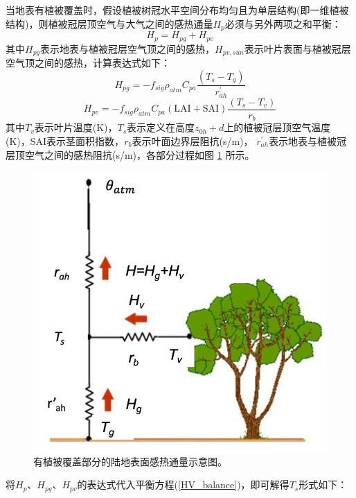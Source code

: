 当地表有植被覆盖时，假设植被树冠水平空间分布均匀且为单层结构(即一维植被结构)，则植被冠层顶空气与大气之间的感热通量$H_p$必须与另外两项之和平衡：
\begin{equation}\label{HV_balance}
H_{p}=H_{p g}+H_{p v}
\end{equation}
其中$H_{pg}$表示地表与植被冠层空气顶之间的感热，$H_{pv,sun}$表示叶片表面与植被冠层空气顶之间的感热，计算表达式如下：
\begin{equation}
H_{p g}=-f_{sig} \rho_{atm} C_{pa} \frac{\left(T_{s}-T_{g}\right)}{r_{a h}^{\prime}}
\end{equation}
\begin{equation}
H_{p v}=-f_{sig} \rho_{atm} C_{pa}(\text {LAI}+\text {SAI}) \frac{\left(T_{s}-T_{v}\right)}{r_{b}}
\end{equation}
其中$T_v$表示叶片温度(K)，$T_s$表示定义在高度$z_{0h}+d$上的植被冠层顶空气温度(K)，SAI表示茎面积指数，$r_b$表示叶面边界层阻抗(s/m)，
$r_{ah}^\prime$表示地表与植被冠层顶空气之间的感热阻抗(s/m)，各部分过程如图 \ref{fig:有植被覆盖部分的陆地表面感热通量示意图} 所示。
{
\begin{figure}[]
\centering
\includegraphics{Figures/地表湍流交换过程/有植被覆盖部分的陆地表面感热通量示意图.png}
\caption{有植被覆盖部分的陆地表面感热通量示意图。}
\label{fig:有植被覆盖部分的陆地表面感热通量示意图}
\end{figure}
}
将$H_p$、$H_{pg}$、$H_{pv}$的表达式代入平衡方程(\ref{HV_balance})，即可解得$T_s$形式如下：
